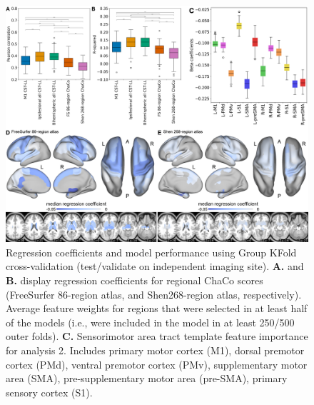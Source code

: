 \documentclass[10pt]{article}
\begin{document}
\begin{figure}[htp]
\centering
\includegraphics[width=1\linewidth]{figures/Analysis2.png}
\caption{Regression coefficients and model performance using Group KFold cross-validation (test/validate on independent imaging site). \textbf{A.} and \textbf{B.} display regression coefficients for regional ChaCo scores (FreeSurfer 86-region atlas, and Shen268-region atlas, respectively). Average feature weights for regions that were selected in at least half of the models (i.e., were included in the model in at least 250/500 outer folds). \textbf{C.} Sensorimotor area tract template feature importance for analysis 2. Includes primary motor cortex (M1), dorsal premotor cortex (PMd), ventral premotor cortex (PMv), supplementary motor area (SMA), pre-supplementary motor area (pre-SMA), primary sensory cortex (S1).}
\label{nemotool}
\end{figure}
\end{document}
